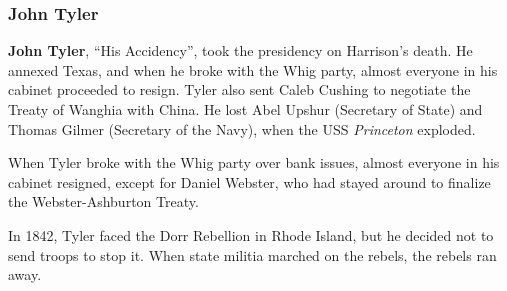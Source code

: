 \subsubsection*{John Tyler}

\textbf{John Tyler}, ``His Accidency'', took the presidency on Harrison's death.
He annexed Texas, and when he broke with the Whig party, almost everyone in his cabinet proceeded to resign.
Tyler also sent Caleb Cushing to negotiate the Treaty of Wanghia with China.
He lost Abel Upshur (Secretary of State) and Thomas Gilmer (Secretary of the Navy),
when the USS \textit{Princeton} exploded.

When Tyler broke with the Whig party over bank issues, almost everyone in his cabinet resigned,
except for Daniel Webster, who had stayed around to finalize the Webster-Ashburton Treaty.

In 1842, Tyler faced the Dorr Rebellion in Rhode Island, but he decided not to send troops to stop it.
When state militia marched on the rebels, the rebels ran away.

